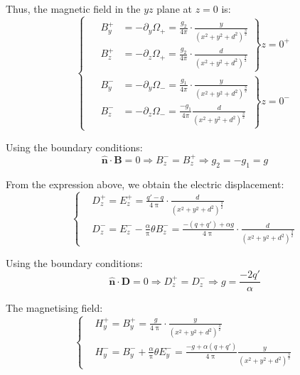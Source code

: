 Thus, the magnetic field in the $yz$ plane at $z=0$ is:
\begin{equation}
    \left\{
    \begin{aligned}
        & \left. 
        \begin{aligned}
            B_y^+ &= -\partial_y \Omega_+ = \frac{g_2}{4\pi} \cdot \frac{y}{(x^2+y^2+d^2)^{\frac{3}{2}}} \\
            B_z^+ &= -\partial_z \Omega_+ = \frac{g_2}{4\pi} \cdot \frac{d}{(x^2+y^2+d^2)^{\frac{3}{2}}}
        \end{aligned} 
        \right\} z=0^+ \\[10pt]
        & \left. 
        \begin{aligned}
            B_y^- &= -\partial_y \Omega_- = \frac{g_1}{4\pi} \cdot \frac{y}{(x^2+y^2+d^2)^{\frac{3}{2}}} \\
            B_z^- &= -\partial_z \Omega_- = \frac{-g_1}{4\pi} \frac{d}{(x^2+y^2+d^2)^{\frac{3}{2}}}
        \end{aligned} 
        \right\} z=0^-
    \end{aligned}
    \right.
\end{equation}

Using the boundary conditions:
\begin{equation}
\bm{\hat{n}} \cdot \bm{B} = 0 \Rightarrow B_z^- = B_z^+ \Rightarrow g_2 = -g_1 = g
\end{equation}

From the expression above, we obtain the electric displacement:
\begin{equation}
\left\{
\begin{aligned}
&D_z^+ = E_z^+ = \frac{q'-q}{4\uppi} \cdot \frac{d}{(x^2+y^2+d^2)^{\frac{3}{2}}} \\
&D_z^- = E_z^- - \frac{\alpha}{\uppi} \theta B_z^- = \frac{-(q+q')+\alpha g}{4\uppi} \cdot \frac{d}{(x^2+y^2+d^2)^{\frac{3}{2}}}
\end{aligned}
\right.
\end{equation}

Using the boundary conditions:
\begin{equation}
\bm{\hat{n}} \cdot \bm{D} = 0 \Rightarrow D_z^+ = D_z^- \Rightarrow g = \frac{-2q'}{\alpha}
\end{equation}

The magnetising field:
\begin{equation}
\left\{
\begin{aligned}
&H_y^+ = B_y^+ = \frac{g}{4\uppi} \cdot \frac{y}{(x^2+y^2+d^2)^{\frac{3}{2}}} \\
&H_y^- = B_y^- + \frac{\alpha}{\uppi} \theta E_y^- = \frac{-g+\alpha(q+q')}{4\uppi} \frac{y}{(x^2+y^2+d^2)^{\frac{3}{2}}}
\end{aligned}
\right.
\end{equation}

